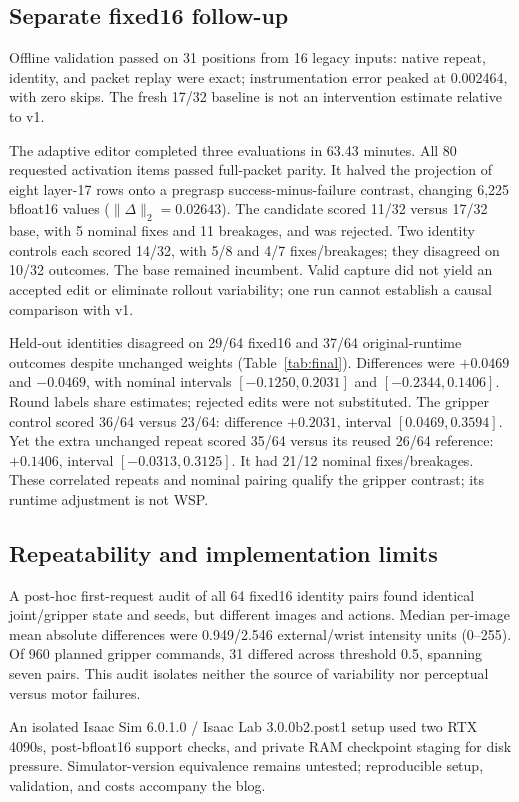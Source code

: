 \subsection{Separate fixed16 follow-up}
Offline validation passed on 31 positions from 16 legacy inputs: native repeat, identity, and packet replay were exact; instrumentation error peaked at 0.002464, with zero skips. The fresh 17/32 baseline is not an intervention estimate relative to v1.

The adaptive editor completed three evaluations in 63.43 minutes. All 80 requested activation items passed full-packet parity. It halved the projection of eight layer-17 rows onto a pregrasp success-minus-failure contrast, changing 6,225 bfloat16 values ($\|\Delta\|_2=0.02643$). The candidate scored 11/32 versus 17/32 base, with 5 nominal fixes and 11 breakages, and was rejected. Two identity controls each scored 14/32, with 5/8 and 4/7 fixes/breakages; they disagreed on 10/32 outcomes. The base remained incumbent. Valid capture did not yield an accepted edit or eliminate rollout variability; one run cannot establish a causal comparison with v1.

Held-out identities disagreed on 29/64 fixed16 and 37/64 original-runtime outcomes despite unchanged weights (Table~\ref{tab:final}). Differences were $+0.0469$ and $-0.0469$, with nominal intervals $[-0.1250,0.2031]$ and $[-0.2344,0.1406]$. Round labels share estimates; rejected edits were not substituted. The gripper control scored 36/64 versus 23/64: difference $+0.2031$, interval $[0.0469,0.3594]$. Yet the extra unchanged repeat scored 35/64 versus its reused 26/64 reference: $+0.1406$, interval $[-0.0313,0.3125]$. It had 21/12 nominal fixes/breakages. These correlated repeats and nominal pairing qualify the gripper contrast; its runtime adjustment is not WSP.


\subsection{Repeatability and implementation limits}
A post-hoc first-request audit of all 64 fixed16 identity pairs found identical joint/gripper state and seeds, but different images and actions. Median per-image mean absolute differences were 0.949/2.546 external/wrist intensity units (0--255). Of 960 planned gripper commands, 31 differed across threshold 0.5, spanning seven pairs. This audit isolates neither the source of variability nor perceptual versus motor failures.

An isolated Isaac Sim 6.0.1.0 / Isaac Lab 3.0.0b2.post1 setup used two RTX 4090s, post-bfloat16 support checks, and private RAM checkpoint staging for disk pressure. Simulator-version equivalence remains untested; reproducible setup, validation, and costs accompany the blog.

